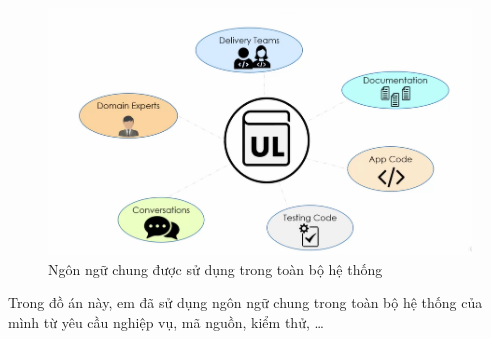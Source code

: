 \begin{figure}[H]

\centering

\includegraphics[scale = 0.6]{pictures/_ngon_ngu_chung_duoc_su_dung_trong_toan_bo_he_thong/main.png}

\caption{Ngôn ngữ chung được sử dụng trong toàn bộ hệ thống}

\end{figure}

\begin{example} Trong đồ án này, em đã sử dụng ngôn ngữ chung trong toàn bộ hệ thống của mình từ yêu cầu nghiệp vụ, mã nguồn, kiểm thử, \dots \end{example}